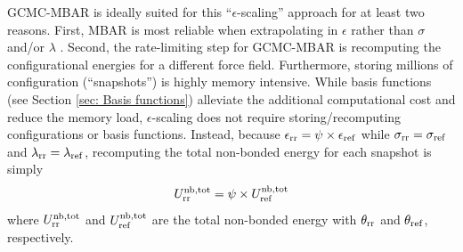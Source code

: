 \documentclass[journal=jced,manuscript=article]{achemso}
\begin{document}


GCMC-MBAR is ideally suited for this ``$\epsilon$-scaling'' approach for at least two reasons. First, MBAR is most reliable when extrapolating in $\epsilon$ rather than $\sigma$ and/or $\lambda$ \cite{Postdoc_1}. Second, the rate-limiting step for GCMC-MBAR is recomputing the configurational energies for a different force field. Furthermore, storing millions of configuration (``snapshots'') is highly memory intensive. While basis functions (see Section \ref{sec: Basis functions}) alleviate the additional computational cost and reduce the memory load, $\epsilon$-scaling does not require storing/recomputing configurations or basis functions. Instead, because $\epsilon_{\rm rr} = \psi \times \epsilon_{\rm ref}$ while $\sigma_{\rm rr} = \sigma_{\rm ref}$ and $\lambda_{\rm rr} = \lambda_{\rm ref}$, recomputing the total non-bonded energy for each snapshot is simply 
\begin{equation}
U^{\rm nb, tot}_{\rm rr} = \psi \times U^{\rm nb, tot}_{\rm ref}
\end{equation}
where $U^{\rm nb, tot}_{\rm rr}$ and $U^{\rm nb, tot}_{\rm ref}$ are the total non-bonded energy with $\theta_{\rm rr}$ and $\theta_{\rm ref}$, respectively.
\end{document}
